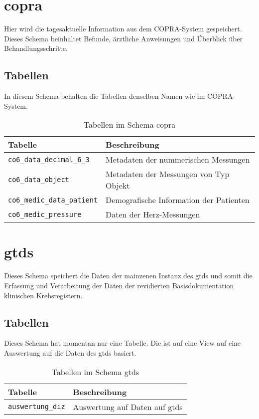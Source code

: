   \section{copra}
  Hier wird die tagesaktuelle Information aus dem COPRA-System gespeichert. Dieses Schema beinhaltet Befunde, ärztliche Anweisungen und Überblick über Behandlungsschritte.
  \subsection{Tabellen}
  In diesem Schema behalten die Tabellen denselben Namen wie im COPRA-System. 
  \begin{table}[ht]
  	\centering   
  	\caption{Tabellen im Schema copra}
  	\begin{tabular}{||l|l||}   		
  		\hline
  		Tabelle & Beschreibung \\ [0.5ex]
  		\hline\hline
  		\texttt{co6\_data\_decimal\_6\_3} & Metadaten der nummerischen Messungen \\
  		\hline
  		\texttt{co6\_data\_object} & Metadaten der Messungen von Typ Objekt\\
  		\hline
  		\texttt{co6\_medic\_data\_patient} & Demografische Information der Patienten \\
  		\hline
  		\texttt{co6\_medic\_pressure} & Daten der Herz-Messungen\\
  		\hline
  	\end{tabular}
  \end{table}

  \section{gtds} 
  Dieses Schema speichert die Daten der mainzenen Instanz des \ac{gtds} und somit die Erfassung und Verarbeitung der Daten der revidierten Basisdokumentation klinischen Krebsregistern.
  \subsection{Tabellen}
  Dieses Schema hat momentan nur eine Tabelle. Die ist auf eine View auf eine Auswertung auf die Daten des \ac{gtds} basiert.
  \begin{table}[ht]
  	\centering   
  	\caption{Tabellen im Schema gtds}
  	\begin{tabular}{||l|l||}   		
  		\hline
  		Tabelle & Beschreibung \\ [0.5ex]
  		\hline\hline
  		\texttt{auswertung\_diz} & Auswertung auf Daten auf \ac{gtds} \\
  		\hline
  	\end{tabular}
  \end{table}
